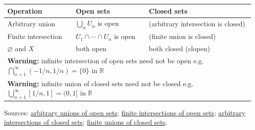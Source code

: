 \begin{tcolorbox}[colback=gray!6, colframe=gray!40, arc=2pt,
  left=8pt, right=8pt, top=6pt, bottom=6pt,
  title={\small\textbf{Part VI \enspace Topology Axioms:
         Operations on Open and Closed Sets}},
  fonttitle=\small\bfseries]
\small
\renewcommand{\arraystretch}{1.55}
\begin{tabular}{p{3.4cm} p{3.6cm} p{4.8cm}}
\toprule
\textbf{Operation} & \textbf{Open sets} & \textbf{Closed sets} \\
\midrule

Arbitrary union
  & $\bigcup_\alpha U_\alpha$ is open
  & (arbitrary intersection is closed) \\[2pt]

Finite intersection
  & $U_1 \cap \cdots \cap U_n$ is open
  & (finite union is closed) \\[2pt]

$\varnothing$ and $X$
  & both open
  & both closed (clopen) \\[2pt]

\midrule
\multicolumn{3}{l}{\textbf{Warning:} infinite intersection of open sets need not be open
  \quad e.g.\ $\bigcap_{n=1}^\infty (-1/n, 1/n) = \{0\}$ in $\mathbb{R}$} \\[2pt]
\multicolumn{3}{l}{\textbf{Warning:} infinite union of closed sets need not be closed
  \quad e.g.\ $\bigcup_{n=1}^\infty [1/n, 1] = (0, 1]$ in $\mathbb{R}$} \\[2pt]
\bottomrule
\end{tabular}

\medskip
\noindent Sources:
\hyperref[prf:union-open-sets]{arbitrary unions of open sets};
\hyperref[prf:intersection-open-sets]{finite intersections of open sets};
\hyperref[prf:intersection-closed-set]{arbitrary intersections of closed sets};
\hyperref[prf:finite-union-closed-sets]{finite unions of closed sets}.
\end{tcolorbox}

\bigskip



